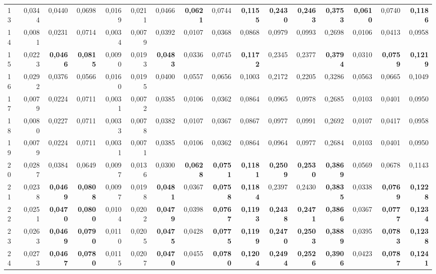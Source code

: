 \begin{table}[htp!]
\begin{adjustwidth}{-2cm}{}
\begin{tabular}{ l | *{15}{| r}}
13	&	0,0344	&	0,0440	&	0,0698	&	0,0169	&	0,0211	&	0,0466	&	\textbf{0,0621}	&	0,0744	&	\textbf{0,1155}	&	\textbf{0,2430}	&	\textbf{0,2463}	&	\textbf{0,3753}	&	\textbf{0,0610}	&	0,0740	&	\textbf{0,1186}	\\
14	&	0,0081	&	0,0231	&	0,0714	&	0,0034	&	0,0079	&	0,0392	&	0,0107	&	0,0368	&	0,0868	&	0,0979	&	0,0993	&	0,2698	&	0,0106	&	0,0413	&	0,0958	\\
15	&	0,0223	&	\textbf{0,0466}	&	\textbf{0,0815}	&	0,0090	&	0,0193	&	\textbf{0,0483}	&	0,0336	&	0,0745	&	\textbf{0,1172}	&	0,2345	&	0,2377	&	\textbf{0,3794}	&	0,0310	&	\textbf{0,0759}	&	\textbf{0,1219}	\\
16	&	0,0292	&	0,0376	&	0,0566	&	0,0160	&	0,0195	&	0,0400	&	0,0557	&	0,0656	&	0,1003	&	0,2172	&	0,2205	&	0,3286	&	0,0563	&	0,0665	&	0,1049	\\
17	&	0,0079	&	0,0224	&	0,0711	&	0,0031	&	0,0072	&	0,0385	&	0,0106	&	0,0362	&	0,0864	&	0,0965	&	0,0978	&	0,2685	&	0,0103	&	0,0401	&	0,0950	\\
18	&	0,0080	&	0,0227	&	0,0711	&	0,0033	&	0,0078	&	0,0382	&	0,0107	&	0,0367	&	0,0867	&	0,0977	&	0,0991	&	0,2692	&	0,0107	&	0,0417	&	0,0958	\\
19	&	0,0079	&	0,0224	&	0,0711	&	0,0031	&	0,0071	&	0,0385	&	0,0106	&	0,0362	&	0,0864	&	0,0964	&	0,0977	&	0,2684	&	0,0103	&	0,0401	&	0,0950	\\
20	&	0,0287	&	0,0384	&	0,0649	&	0,0097	&	0,0136	&	0,0300	&	\textbf{0,0628}	&	\textbf{0,0751}	&	\textbf{0,1181}	&	\textbf{0,2509}	&	\textbf{0,2530}	&	\textbf{0,3869}	&	0,0569	&	0,0678	&	0,1143	\\
21	&	0,0238	&	\textbf{0,0469}	&	\textbf{0,0808}	&	0,0097	&	0,0198	&	\textbf{0,0481}	&	0,0367	&	\textbf{0,0758}	&	\textbf{0,1184}	&	0,2397	&	0,2430	&	\textbf{0,3835}	&	0,0338	&	\textbf{0,0769}	&	\textbf{0,1228}	\\
22	&	0,0251	&	\textbf{0,0470}	&	\textbf{0,0800}	&	0,0104	&	0,0202	&	\textbf{0,0479}	&	0,0398	&	\textbf{0,0767}	&	\textbf{0,1193}	&	\textbf{0,2438}	&	\textbf{0,2471}	&	\textbf{0,3866}	&	0,0367	&	\textbf{0,0777}	&	\textbf{0,1234}	\\
23	&	0,0263	&	\textbf{0,0469}	&	\textbf{0,0790}	&	0,0110	&	0,0205	&	\textbf{0,0475}	&	0,0428	&	\textbf{0,0775}	&	\textbf{0,1199}	&	\textbf{0,2470}	&	\textbf{0,2503}	&	\textbf{0,3889}	&	0,0395	&	\textbf{0,0783}	&	\textbf{0,1238}	\\
24	&	0,0273	&	\textbf{0,0467}	&	\textbf{0,0780}	&	0,0115	&	0,0207	&	\textbf{0,0470}	&	0,0455	&	\textbf{0,0780}	&	\textbf{0,1204}	&	\textbf{0,2494}	&	\textbf{0,2526}	&	\textbf{0,3906}	&	0,0423	&	\textbf{0,0787}	&	\textbf{0,1241}	\\

\end{tabular}
\end{adjustwidth}
\end{table}
